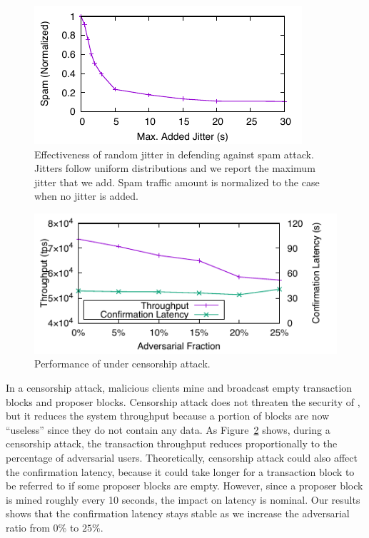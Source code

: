 \begin{figure}
    \centering
    \includegraphics{figures/attack-fig-spamming.pdf}
    \caption{\small Effectiveness of random jitter in defending against spam attack. Jitters follow uniform distributions and we report the maximum jitter that we add. Spam traffic amount is normalized to the case when no jitter is added.}
    \label{fig:attack-spamming}
\end{figure}









\begin{figure}
    \centering
    \includegraphics{figures/attack-fig-censor.pdf}
    \caption{\small Performance of \prism under  censorship attack.}
    \label{fig:attack-censor}
\end{figure}

In a censorship attack, malicious clients mine and broadcast empty transaction blocks and proposer blocks. Censorship attack does not threaten the security of \prism, but it reduces the system throughput because a portion of blocks are now ``useless'' since they do not contain any data. As Figure~\ref{fig:attack-censor} shows, during a censorship attack, the transaction throughput reduces proportionally to the percentage of adversarial users. Theoretically, censorship attack could also affect the confirmation latency, because it could take longer for a transaction block to be referred to if some proposer blocks are empty. However, since a proposer block is mined roughly every 10 seconds, the impact on latency is nominal. Our results shows that the confirmation latency stays stable as we increase the adversarial ratio from $0\%$ to $25\%$.


